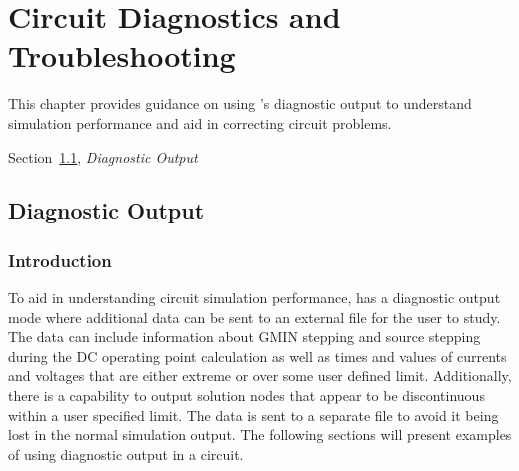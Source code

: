 

\chapter{Circuit Diagnostics and Troubleshooting}

{
This chapter provides guidance on using \Xyce{}'s diagnostic output 
to understand simulation performance and aid in correcting
circuit problems.
\begin{XyceItemize}
\item Section~\ref{DiagnosticOutput}, {\em Diagnostic Output}
\end{XyceItemize}
}

\section{Diagnostic Output}
\label{DiagnosticOutput}

\subsection{Introduction}
To aid in understanding circuit simulation performance, \Xyce{} has a diagnostic output mode
where additional data can be sent to an external file for the user to study.  The data 
can include information about GMIN stepping and source stepping during the DC operating
point calculation as well as times and values of currents and voltages that are either 
extreme or over some user defined limit.  Additionally, there is a capability to output 
solution nodes that appear to be discontinuous within a user specified limit.  The data 
is sent to a separate file to avoid it being lost in the normal simulation output.  The 
following sections will present examples of using diagnostic output in a circuit.


